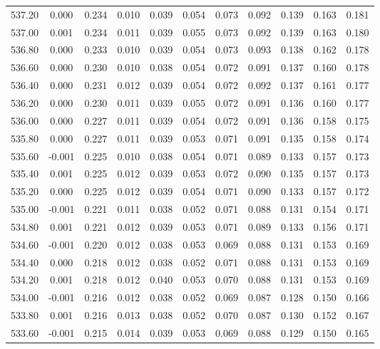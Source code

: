 \begin{longtable}{cccccccccc}
    537.20 &  0.000 &  0.234 &  0.010 &  0.039 &  0.054 &  0.073 &  0.092 &  0.139 &  0.163 &  0.181 \\
    537.00 &  0.001 &  0.234 &  0.011 &  0.039 &  0.055 &  0.073 &  0.092 &  0.139 &  0.163 &  0.180 \\
    536.80 &  0.000 &  0.233 &  0.010 &  0.039 &  0.054 &  0.073 &  0.093 &  0.138 &  0.162 &  0.178 \\
    536.60 &  0.000 &  0.230 &  0.010 &  0.038 &  0.054 &  0.072 &  0.091 &  0.137 &  0.160 &  0.178 \\
    536.40 &  0.000 &  0.231 &  0.012 &  0.039 &  0.054 &  0.072 &  0.092 &  0.137 &  0.161 &  0.177 \\
    536.20 &  0.000 &  0.230 &  0.011 &  0.039 &  0.055 &  0.072 &  0.091 &  0.136 &  0.160 &  0.177 \\
    536.00 &  0.000 &  0.227 &  0.011 &  0.039 &  0.054 &  0.072 &  0.091 &  0.136 &  0.158 &  0.175 \\
    535.80 &  0.000 &  0.227 &  0.011 &  0.039 &  0.053 &  0.071 &  0.091 &  0.135 &  0.158 &  0.174 \\
    535.60 & -0.001 &  0.225 &  0.010 &  0.038 &  0.054 &  0.071 &  0.089 &  0.133 &  0.157 &  0.173 \\
    535.40 &  0.001 &  0.225 &  0.012 &  0.039 &  0.053 &  0.072 &  0.090 &  0.135 &  0.157 &  0.173 \\
    535.20 &  0.000 &  0.225 &  0.012 &  0.039 &  0.054 &  0.071 &  0.090 &  0.133 &  0.157 &  0.172 \\
    535.00 & -0.001 &  0.221 &  0.011 &  0.038 &  0.052 &  0.071 &  0.088 &  0.131 &  0.154 &  0.171 \\
    534.80 &  0.001 &  0.221 &  0.012 &  0.039 &  0.053 &  0.071 &  0.089 &  0.133 &  0.156 &  0.171 \\
    534.60 & -0.001 &  0.220 &  0.012 &  0.038 &  0.053 &  0.069 &  0.088 &  0.131 &  0.153 &  0.169 \\
    534.40 &  0.000 &  0.218 &  0.012 &  0.038 &  0.052 &  0.071 &  0.088 &  0.131 &  0.153 &  0.169 \\
    534.20 &  0.001 &  0.218 &  0.012 &  0.040 &  0.053 &  0.070 &  0.088 &  0.131 &  0.153 &  0.169 \\
    534.00 & -0.001 &  0.216 &  0.012 &  0.038 &  0.052 &  0.069 &  0.087 &  0.128 &  0.150 &  0.166 \\
    533.80 &  0.001 &  0.216 &  0.013 &  0.038 &  0.052 &  0.070 &  0.087 &  0.130 &  0.152 &  0.167 \\
    533.60 & -0.001 &  0.215 &  0.014 &  0.039 &  0.053 &  0.069 &  0.088 &  0.129 &  0.150 &  0.165 \\

\end{longtable}
